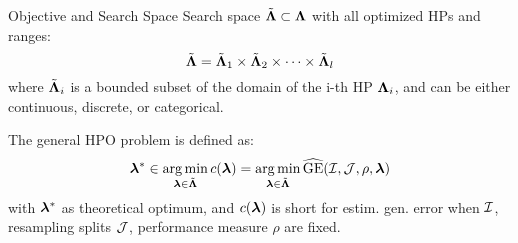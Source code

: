 \documentclass[11pt,compress,t,notes=noshow, xcolor=table]{beamer}
\begin{document}
\begin{vbframe}{Objective and Search Space}
Search space $\tilde{\bm{\Lambda}} \subset \bm{\Lambda}$ with all optimized HPs and ranges:
$$\tilde{\bm{\Lambda}} = \tilde{\bm{\Lambda}}_1 \times \tilde{\bm{\Lambda}}_2 \times \dots \times \tilde{\bm{\Lambda}}_l$$
 where $\tilde{\bm{\Lambda}}_i$ is a bounded subset of the domain of the i-th HP $\bm{\Lambda}_i$, and can be either continuous, discrete, or categorical.


\vspace{1cm}

The general HPO problem is defined as:
\begin{eqnarray*}
    \bm{\lambda}^{*} \in \operatorname*{arg\,min}_{\bm{\lambda} \in \tilde{\bm{\Lambda}}} c(\bm{\lambda}) = \operatorname*{arg\,min}_{\bm{\lambda} \in \tilde{\bm{\Lambda}}}
    \widehat{\mathrm{GE}}(\mathcal{I}, \mathcal{J}, \rho, \bm{\lambda})
\end{eqnarray*}
with $\bm{\lambda}^{*}$ as theoretical optimum, and $c(\bm{\lambda})$ is short for estim. gen. error
when $\mathcal{I}$, resampling splits $\mathcal{J}$, performance measure $\rho$ are fixed.
\end{vbframe}

\end{document}
